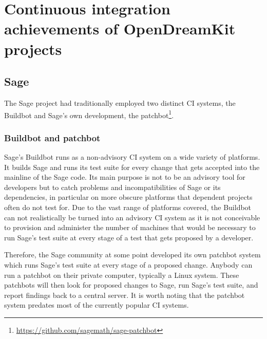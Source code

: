 \documentclass{deliverablereport}
\begin{document}


\hypertarget{project-reports}{%
\section{Continuous integration achievements of OpenDreamKit projects}\label{project-reports}}

\subsection{Sage}

The Sage project had traditionally employed two distinct CI systems, the
Buildbot and Sage's own development, the
patchbot\footnote{\url{https://github.com/sagemath/sage-patchbot}}.

\subsubsection{Buildbot and patchbot}
Sage's Buildbot runs as a non-advisory CI system on a wide variety of
platforms. It builds Sage and runs its test suite for every change that gets
accepted into the mainline of the Sage code. Its main purpose is not to be an
advisory tool for developers but to catch problems and incompatibilities of
Sage or its dependencies, in particular on more obscure platforms that
dependent projects often do not test for. Due to the vast range of platforms
covered, the Buildbot can not realistically be turned into an advisory CI
system as it is not conceivable to provision and administer the number of
machines that would be necessary to run Sage's test suite at every stage of a
test that gets proposed by a developer.

Therefore, the Sage community at some point developed its own patchbot system
which runs Sage's test suite at every stage of a proposed change. Anybody can
run a patchbot on their private computer, typically a Linux system. These
patchbots will then look for proposed changes to Sage, run Sage's test suite,
and report findings back to a central server. It is worth noting that the
patchbot system predates most of the currently popular CI systems.
\end{document}
